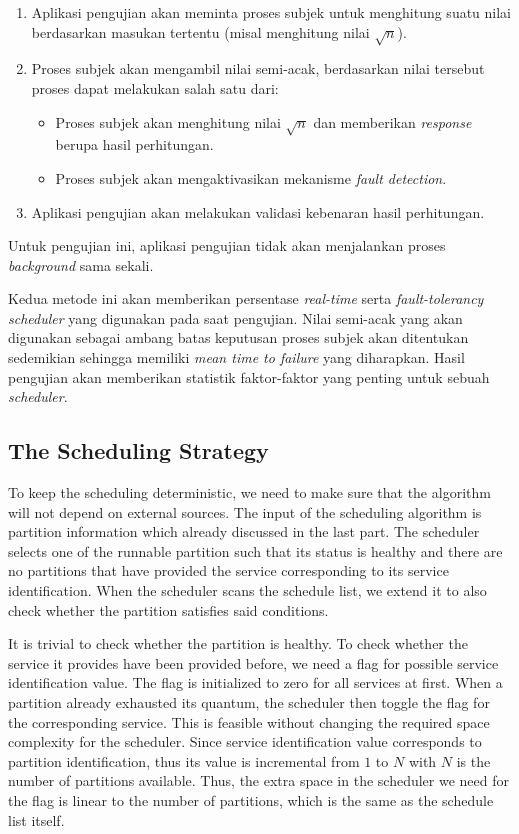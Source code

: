 \begin{enumerate}
    \item Aplikasi pengujian akan meminta proses subjek untuk menghitung suatu nilai berdasarkan masukan tertentu (misal menghitung nilai $\sqrt{n}$).
    \item Proses subjek akan mengambil nilai semi-acak, berdasarkan nilai tersebut proses dapat melakukan salah satu dari:
        \begin{itemize}
            \item Proses subjek akan menghitung nilai $\sqrt{n}$ dan memberikan \textit{response} berupa hasil perhitungan.
            \item Proses subjek akan mengaktivasikan mekanisme \textit{fault detection}.
        \end{itemize}
    \item Aplikasi pengujian akan melakukan validasi kebenaran hasil perhitungan.
\end{enumerate}

Untuk pengujian ini, aplikasi pengujian tidak akan menjalankan proses \textit{background} sama
sekali.

Kedua metode ini akan memberikan persentase \textit{real-time} serta \textit{fault-tolerancy}
\textit{scheduler} yang digunakan pada saat pengujian.  Nilai semi-acak yang akan digunakan
sebagai ambang batas keputusan proses subjek akan ditentukan sedemikian sehingga memiliki
\textit{mean time to failure} yang diharapkan.  Hasil pengujian akan memberikan statistik
faktor-faktor yang penting untuk sebuah \textit{scheduler}.

\subsection{The Scheduling Strategy}

To keep the scheduling deterministic, we need to make sure that the algorithm will not depend on
external sources. The input of the scheduling algorithm is partition information which already
discussed in the last part. The scheduler selects one of the runnable partition such that its
status is healthy and there are no partitions that have provided the service corresponding to
its service identification. When the scheduler scans the schedule list, we extend it to also
check whether the partition satisfies said conditions.

It is trivial to check whether the partition is healthy. To check whether the service it
provides have been provided before, we need a flag for possible service identification value.
The flag is initialized to zero for all services at first. When a partition already exhausted
its quantum, the scheduler then toggle the flag for the corresponding service. This is feasible
without changing the required space complexity for the scheduler. Since service identification
value corresponds to partition identification, thus its value is incremental from $1$ to $N$
with $N$ is the number of partitions available. Thus, the extra space in the scheduler we need
for the flag is linear to the number of partitions, which is the same as the schedule list
itself.

